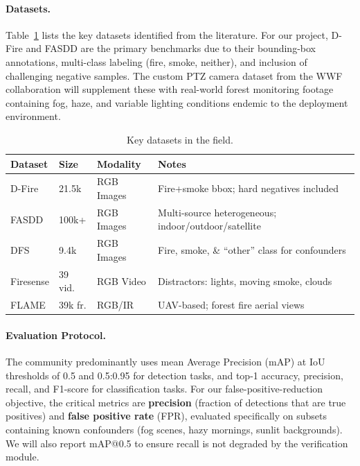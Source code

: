 \documentclass[11pt,twocolumn]{article}
\begin{document}
\paragraph{Datasets.}
Table~\ref{tab:datasets} lists the key datasets identified from the literature. For our project, D-Fire and FASDD are the primary benchmarks due to their bounding-box annotations, multi-class labeling (fire, smoke, neither), and inclusion of challenging negative samples. The custom PTZ camera dataset from the WWF collaboration will supplement these with real-world forest monitoring footage containing fog, haze, and variable lighting conditions endemic to the deployment environment.

\begin{table}[h]
\caption{Key datasets in the field.}
\label{tab:datasets}
\vskip 0.1in
\begin{center}
\begin{small}
\begin{tabular}{p{1.6cm} p{1.1cm} p{1.4cm} p{2.0cm}}
\toprule
\textbf{Dataset} & \textbf{Size} & \textbf{Modality} 
& \textbf{Notes} \\
\midrule
D-Fire & 21.5k & RGB Images & Fire+smoke bbox; hard negatives included \\
FASDD & 100k+ & RGB Images & Multi-source heterogeneous; indoor/outdoor/satellite \\
DFS & 9.4k & RGB Images & Fire, smoke, \& ``other'' class for confounders \\
Firesense & 39 vid. & RGB Video & Distractors: lights, moving smoke, clouds \\
FLAME & 39k fr. & RGB/IR & UAV-based; forest fire aerial views \\
\bottomrule
\end{tabular}
\end{small}
\end{center}
\end{table}

\paragraph{Evaluation Protocol.}
The community predominantly uses mean Average Precision (mAP) at IoU thresholds of 0.5 and 0.5:0.95 for detection tasks, and top-1 accuracy, precision, recall, and F1-score for classification tasks. For our false-positive-reduction objective, the critical metrics are \textbf{precision} (fraction of detections that are true positives) and \textbf{false positive rate} (FPR), evaluated specifically on subsets containing known confounders (fog scenes, hazy mornings, sunlit backgrounds). We will also report mAP@0.5 to ensure recall is not degraded by the verification module.
\end{document}

